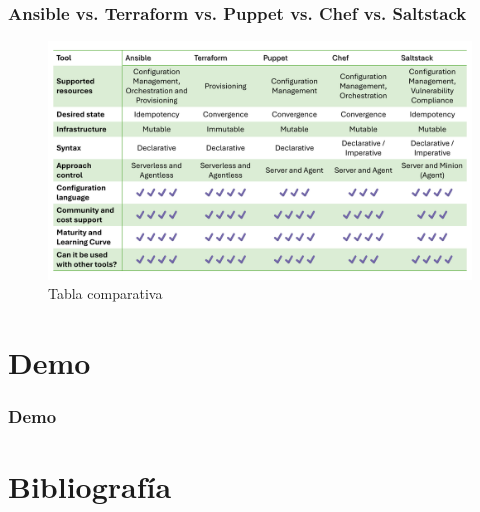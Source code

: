 \documentclass[
	11pt, %
]{beamer}
\begin{document}
\begin{frame}
	\frametitle{Ansible vs. Terraform vs. Puppet vs. Chef vs. Saltstack}
	
	\begin{figure}
		\includegraphics[width=0.9\linewidth]{alternativaTabla.pdf}
            \caption{Tabla comparativa \href{https://coralogix.com/blog/the-definitive-guide-to-configuration-management-tools/}{\cite{p5}}}
	\end{figure}

\end{frame}


\section{Demo}

\begin{frame}
	\frametitle{Demo}
	
\end{frame}


\section{Bibliografía}
\end{document}
